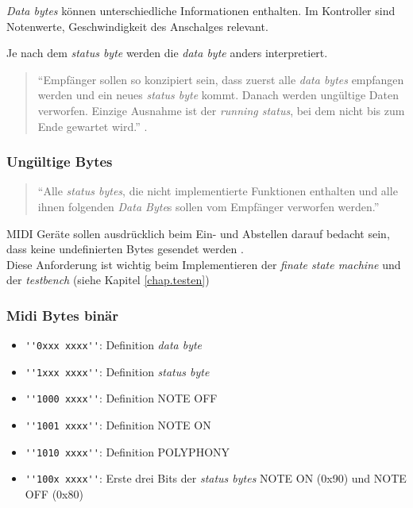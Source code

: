 \textit{Data bytes} können unterschiedliche Informationen enthalten. Im Kontroller sind Notenwerte, Geschwindigkeit des Anschalges relevant.

Je nach dem \textit{status byte} werden die \textit{data byte} anders interpretiert. 

\begin{quote}
``Empfänger sollen so konzipiert sein, dass zuerst alle \textit{data bytes} empfangen werden und ein neues \textit{status byte} kommt. Danach werden ungültige Daten verworfen. Einzige Ausnahme ist der \textit{running status}, bei dem nicht bis zum Ende gewartet wird.'' \citep{Midi_specification}.
\end{quote}

\subsubsection*{Ungültige Bytes}

\begin{quote}
``Alle \textit{status bytes}, die nicht implementierte Funktionen enthalten und alle ihnen folgenden \textit{Data Byte}s sollen vom Empfänger verworfen werden.'' \citep{Midi_specification}
\end{quote}

MIDI Geräte sollen ausdrücklich beim Ein- und Abstellen darauf bedacht sein, dass keine undefinierten Bytes gesendet werden \citep{Midi_specification}.\\
Diese Anforderung ist wichtig beim Implementieren der \textit{finate state machine} und der \textit{testbench} (siehe Kapitel \ref{chap.testen})

\subsubsection*{Midi Bytes binär}\label{midi_binaer}

\begin{itemize}
	\item \lstinline|''0xxx xxxx''|: Definition \textit{data byte}
	\item \lstinline|''1xxx xxxx''|: Definition \textit{status byte}
	\item \lstinline|''1000 xxxx''|: Definition NOTE OFF
	\item \lstinline|''1001 xxxx''|: Definition NOTE ON
	\item \lstinline|''1010 xxxx''|: Definition POLYPHONY
	\item \lstinline|''100x xxxx''|: Erste drei Bits der \textit{status bytes} NOTE ON (0x90) und NOTE OFF (0x80)
\end{itemize}
\newpage
